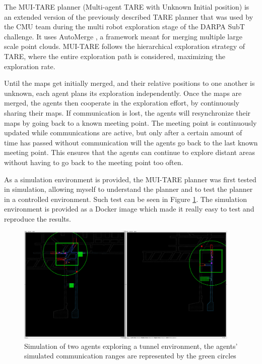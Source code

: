 \documentclass[12pt]{article}
\begin{document}
        The MUI-TARE planner \cite{yan2023mui} (Multi-agent TARE with Unknown Initial position) is an extended version of the previously described TARE planner that was used by the CMU team during the multi robot exploration stage of the DARPA SubT challenge. It uses AutoMerge \cite{yin2023automerge}, a framework meant for merging multiple large scale point clouds. MUI-TARE follows the hierarchical exploration strategy of TARE, where the entire exploration path is considered, maximizing the exploration rate.

        Until the maps get initially merged, and their relative positions to one another is unknown, each agent plans its exploration independently. Once the maps are merged, the agents then cooperate in the exploration effort, by continuously sharing their maps. If communication is lost, the agents will resynchronize their maps by going back to a known meeting point. The meeting point is continuously updated while communications are active, but only after a certain amount of time has passed without communication will the agents go back to the last known meeting point. This ensures that the agents can continue to explore distant areas without having to go back to the meeting point too often. 


        As a simulation environment is provided, the MUI-TARE planner was first tested in simulation, allowing myself to understand the planner and to test the planner in a controlled environment. Such test can be seen in Figure \ref{fig:mui_tare_simulation}. The simulation environment is provided as a Docker image which made it really easy to test and reproduce the results.



        \begin{figure}
            \centering
            \includegraphics[width=0.95\textwidth]{Images/mtare_sim.png}
            \caption{Simulation of two agents exploring a tunnel environment, the agents' simulated communication ranges are represented by the green circles}
            \label{fig:mui_tare_simulation}
        \end{figure}
\end{document}
